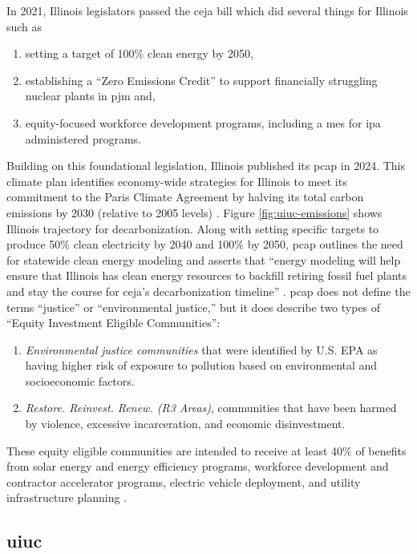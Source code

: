\noindent
In 2021, Illinois legislators passed the \ac{ceja} bill
\cite{harmon_climate_2021} which did several things for Illinois such as
\begin{enumerate}
    \item setting a target of 100\% clean energy by 2050,
    \item establishing a ``Zero Emissions Credit'' to support financially
    struggling nuclear plants in \ac{pjm} and,
    \item equity-focused workforce development programs, including a \acf{mes}
    for \ac{ipa} administered programs.
\end{enumerate}
Building on this foundational legislation, Illinois published its \ac{pcap} in
2024. This climate plan identifies economy-wide strategies for Illinois to meet
its commitment to the Paris Climate Agreement by halving its total carbon
emissions by 2030 (relative to 2005 levels) \cite{kibbey_state_2024}. Figure
\ref{fig:uiuc-emissions} shows Illinois trajectory for decarbonization. Along
with setting specific targets to produce 50\% clean electricity by 2040 and
100\% by 2050, \ac{pcap} outlines the need for statewide clean energy modeling
and asserts that ``energy modeling will help ensure that Illinois has clean
energy resources to backfill retiring fossil fuel plants and stay the course for
\ac{ceja}'s decarbonization timeline'' \cite{kibbey_state_2024}. \ac{pcap} does
not define the terms ``justice'' or ``environmental justice,'' but it does
describe two types of ``Equity Investment Eligible Communities'':
\begin{enumerate}
    \item \textit{Environmental justice communities} that were identified by
    U.S. EPA as having higher risk of exposure to pollution based on
    environmental and socioeconomic factors.
    \item \textit{Restore. Reinvest. Renew. (R3 Areas)}, communities that have
    been harmed by violence, excessive incarceration, and economic
    disinvestment.
\end{enumerate}
These equity eligible communities are intended to receive at least 40\% of
benefits from solar energy and energy efficiency programs, workforce development
and contractor accelerator programs, electric vehicle deployment, and utility
infrastructure planning \cite{kibbey_state_2024}.

\subsection{\acf{uiuc}} 


